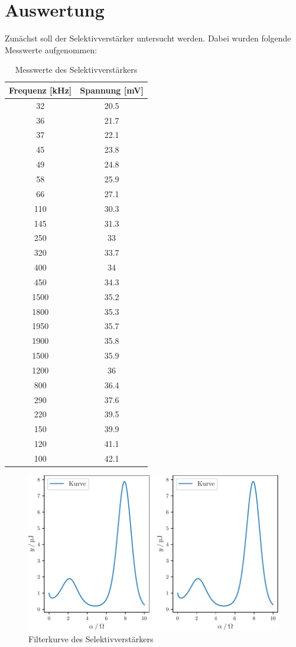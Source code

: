 \section{Auswertung}
\label{sec:Auswertung}

Zunächst soll der Selektivverstärker untersucht werden. Dabei wurden folgende Messwerte aufgenommen:

\begin{table}[H]
  \centering
  \caption{Messwerte des Selektivverstärkers}
  \label{tab:mag}
  \begin{tabular}{c c}
   \toprule
    Frequenz [kHz] & Spannung [mV]\\
   \midrule
   32 & 20.5 \\
   36 & 21.7 \\
   37 & 22.1 \\
   45 & 23.8 \\
   49 & 24.8 \\
   58 & 25.9 \\
   66 & 27.1 \\
  110 & 30.3 \\
  145 & 31.3 \\
  250 & 33   \\
  320 & 33.7 \\
  400 & 34   \\
  450 & 34.3 \\
  1500 & 35.2 \\
  1800 & 35.3 \\
  1950 & 35.7 \\
  1900 & 35.8 \\
  1500 & 35.9 \\
  1200 & 36   \\
  800 & 36.4 \\
  290 & 37.6 \\
  220 & 39.5 \\
  150 & 39.9 \\
  120 & 41.1 \\
  100 & 42.1 \\
   \bottomrule
  \end{tabular}
 \end{table} 

\begin{figure}[H]
  \centering
  \includegraphics{build/plot.pdf}
  \caption{Filterkurve des Selektivverstärkers}
  \label{fig:plot}
\end{figure}

